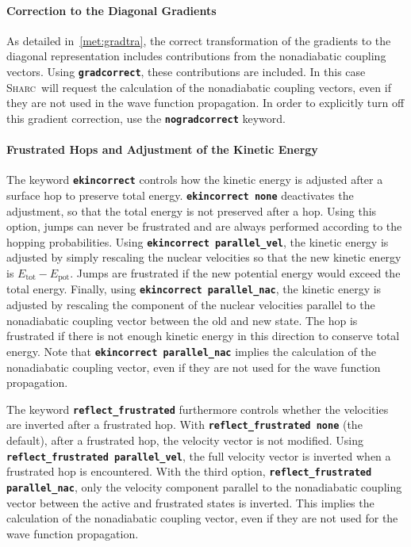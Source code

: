 \documentclass[a4paper,10pt,DIV=15,openany,twoside=false]{scrbook}
\newcommand{\sharc}{\textsc{Sharc}}
\newcommand{\ttt}[1]{\textbf{\texttt{#1}}}
\begin{document}
\paragraph{Correction to the Diagonal Gradients}

As detailed in~\ref{met:gradtra}, the correct transformation of the gradients to the diagonal representation includes contributions from the nonadiabatic coupling vectors. Using \ttt{gradcorrect}, these contributions are included. In this case \sharc\ will request the calculation of the nonadiabatic coupling vectors, even if they are not used in the wave function propagation. In order to explicitly turn off this gradient correction, use the \ttt{nogradcorrect} keyword.

\paragraph{Frustrated Hops and Adjustment of the Kinetic Energy}

The keyword \ttt{ekincorrect} controls how the kinetic energy is adjusted after a surface hop to preserve total energy. \ttt{ekincorrect none} deactivates the adjustment, so that the total energy is not preserved after a hop. Using this option, jumps can never be frustrated and are always performed according to the hopping probabilities. 
Using \ttt{ekincorrect parallel\_vel}, the kinetic energy is adjusted by simply rescaling the nuclear velocities so that the new kinetic energy is $E_{\text{tot}}-E_{\text{pot}}$. Jumps are frustrated if the new potential energy would exceed the total energy.
Finally, using \ttt{ekincorrect parallel\_nac}, the kinetic energy is adjusted by rescaling the component of the nuclear velocities parallel to the nonadiabatic coupling vector between the old and new state. The hop is frustrated if there is not enough kinetic energy in this direction to conserve total energy. Note that \ttt{ekincorrect parallel\_nac} implies the calculation of the nonadiabatic coupling vector, even if they are not used for the wave function propagation.

The keyword \ttt{reflect\_frustrated} furthermore controls whether the velocities are inverted after a frustrated hop.
With \ttt{reflect\_frustrated none} (the default), after a frustrated hop, the velocity vector is not modified.
Using \ttt{reflect\_frustrated parallel\_vel}, the full velocity vector is inverted when a frustrated hop is encountered.
With the third option, \ttt{reflect\_frustrated parallel\_nac}, only the velocity component parallel to the nonadiabatic coupling vector between the active and frustrated states is inverted. This implies the calculation of the nonadiabatic coupling vector, even if they are not used for the wave function propagation.
\end{document}
